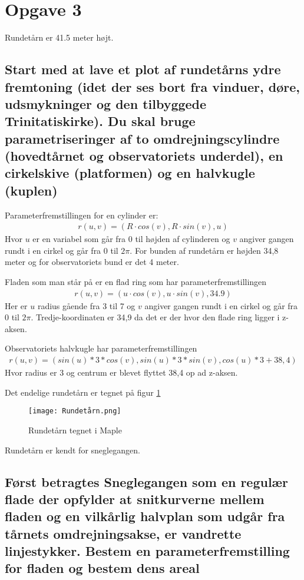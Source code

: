 \section{Opgave 3}
Rundetårn er 41.5 meter højt.

\subsection{Start med at lave et plot af rundetårns ydre fremtoning (idet der ses bort fra vinduer, døre, udsmykninger og den tilbyggede Trinitatiskirke). Du skal bruge parametriseringer af to omdrejningscylindre (hovedtårnet og observatoriets underdel), en cirkelskive (platformen) og en halvkugle (kuplen)}

Parameterfremstillingen for en cylinder er:
\begin{align}
    r(u,v) =(R \cdot cos(v), R \cdot sin(v), u) 
\end{align}
Hvor $u$ er en variabel som går fra 0 til højden af cylinderen og $v$ angiver gangen rundt i en cirkel og går fra 0 til $2\pi$. For bunden af rundetårn er højden 34,8 meter og for observatoriets bund er det 4 meter. 

Fladen som man står på er en flad ring som har parameterfremstillingen
\begin{align}
    r(u,v) = (u \cdot cos(v), u \cdot sin(v), 34.9)
\end{align}
Her er $u$ radius gående fra 3 til 7 og $v$ angiver gangen rundt i en cirkel og går fra 0 til $2\pi$. Tredje-koordinaten er 34,9 da det er der hvor den flade ring ligger i z-aksen.

Observatoriets halvkugle har parameterfremstillingen
\begin{align}
    r(u,v) = (sin(u)*3*cos(v),sin(u)*3*sin(v),cos(u)*3+38,4)
\end{align}
Hvor radius er 3 og centrum er blevet flyttet 38,4 op ad z-aksen.

Det endelige rundetårn er tegnet på figur \ref{rund}
\begin{figure}[htp]
    \centering
    \texttt{[image: Rundetårn.png]}
        \caption{Rundetårn tegnet i Maple}
    \label{rund}
\end{figure}

\newpage

Rundetårn er kendt for sneglegangen.
\subsection{Først betragtes Sneglegangen som en regulær flade der opfylder at snitkurverne mellem fladen og en vilkårlig halvplan som udgår fra tårnets omdrejningsakse, er vandrette linjestykker. Bestem en parameterfremstilling for fladen og bestem dens areal}

